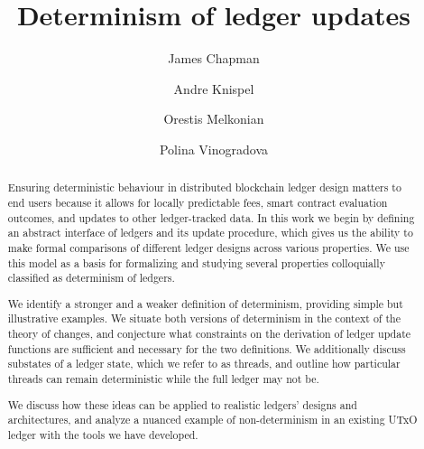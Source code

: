 \documentclass[a4paper,UKenglish,cleveref, autoref, thm-restate]{lipics-v2021}
\title{Determinism of ledger updates} %
\author{James	Chapman}{IOHK} {james.chapman@iohk.io}{}{}
\author{Andre	Knispel}{IOHK} {andre.knispel@iohk.io}{}{}
\author{Orestis	Melkonian}{IOHK \and University of Edinburgh, UK} {orestis.melkonian@ed.ac.uk}{}{}
\author{Polina	Vinogradova}{IOHK} {polina.vinogradova@iohk.io}{}{}
\begin{document}
\maketitle

\begin{abstract}
  Ensuring deterministic behaviour in distributed blockchain ledger design matters to
  end users because it allows for locally predictable fees, smart contract evaluation
  outcomes, and updates to other ledger-tracked data. In this work we begin by defining
  an abstract interface of ledgers and its update procedure, which gives us the ability
  to make formal comparisons of different ledger designs across various properties. We
  use this model as a basis for formalizing and studying several properties colloquially
  classified as determinism of ledgers.

  We identify a stronger and a weaker definition of determinism, providing simple but
  illustrative examples. We situate both versions of determinism in the context of the
  theory of changes, and conjecture what constraints on the derivation of ledger update
  functions are sufficient and necessary for the two definitions. We additionally discuss
  substates of a ledger state, which we refer to as threads, and outline how particular
  threads can remain deterministic while the full ledger may not be.

  We discuss how these ideas can be applied to realistic ledgers' designs and architectures,
  and analyze a nuanced example of non-determinism in an existing UTxO ledger with the
  tools we have developed.

\end{abstract}








\appendix
\end{document}
